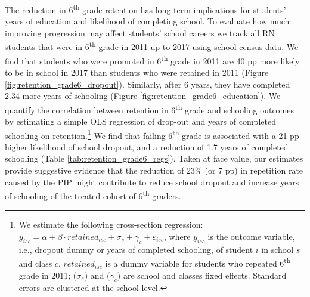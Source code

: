 \documentclass[11pt,a4paper]{article}
\begin{document}
\clearpage


The reduction in 6\textsuperscript{th} grade retention has long-term implications for students’ years of education and likelihood of completing school. To evaluate how much improving progression may affect students' school careers we track all RN students that were in 6\textsuperscript{th} grade in 2011 up to 2017 using school census data. We find that students who were promoted in 6\textsuperscript{th} grade in 2011 are 40 pp more likely to be in school in 2017 than students who were retained in 2011 (Figure \ref{fig:retention_grade6_dropout}). Similarly, after 6 years, they have completed 2.34 more years of schooling (Figure \ref{fig:retention_grade6_education}). We quantify the correlation between retention in 6\textsuperscript{th} grade and schooling outcomes by estimating a simple OLS regression of drop-out and years of completed schooling on retention.\footnote{We estimate the following cross-section regression: $y_{isc} = \alpha + \beta \cdot retained_{isc} + \sigma_{s} + \gamma_{c} + \varepsilon_{isc}$, where $y_{isc}$ is the outcome variable, i.e., dropout dummy or years of completed schooling, of student $i$ in school $s$ and class $c$, $retained_{isc}$ is a dummy variable for students who repeated 6\textsuperscript{th} grade in 2011; ($\sigma_{s}$) and ($\gamma_{c}$) are school and classes fixed effects. Standard errors are clustered at the school level.} We find that failing 6\textsuperscript{th} grade is associated with a 21 pp higher likelihood of school dropout, and a reduction of 1.7 years of completed schooling (Table \ref{tab:retention_grade6_regs}). Taken at face value, our estimates provide suggestive evidence that the reduction of 23\% (or 7 pp) in repetition rate caused by the PIP might contribute to reduce school dropout and increase years of schooling of the treated cohort of 6\textsuperscript{th} graders.
\end{document}
